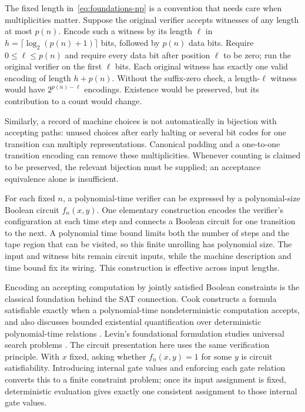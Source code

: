 The fixed length in~\eqref{eq:foundations-np} is a convention that needs
care when multiplicities matter. Suppose the original verifier accepts
witnesses of any length at most $p(n)$. Encode such a witness by its length
$\ell$ in $h=\lceil\log_2(p(n)+1)\rceil$ bits, followed by $p(n)$
data bits. Require $0\le\ell\le p(n)$ and require every data bit after
position $\ell$ to be zero; run the original verifier on the first $\ell$
bits. Each original witness has exactly one valid encoding of length
$h+p(n)$. Without the suffix-zero check, a length-$\ell$ witness would
have $2^{p(n)-\ell}$ encodings. Existence would be preserved, but its
contribution to a count would change.

Similarly, a record of machine choices is not automatically in bijection
with accepting paths: unused choices after early halting or several bit
codes for one transition can multiply representations. Canonical padding
and a one-to-one transition encoding can remove these multiplicities.
Whenever counting is claimed to be preserved, the relevant bijection must
be supplied; an acceptance equivalence alone is insufficient.

For each fixed $n$, a polynomial-time verifier can be expressed by a
polynomial-size Boolean circuit $f_n(x,y)$. One elementary construction
encodes the verifier's configuration at each time step and connects a
Boolean circuit for one transition to the next. A polynomial time bound
limits both the number of steps and the tape region that can be visited,
so this finite unrolling has polynomial size. The input and witness bits
remain circuit inputs, while the machine description and time bound fix
its wiring. This construction is effective across input lengths.

Encoding an accepting computation by jointly satisfied Boolean constraints
is the classical foundation behind the SAT connection. Cook constructs a
formula satisfiable exactly when a polynomial-time nondeterministic
computation accepts, and also discusses bounded existential quantification
over deterministic polynomial-time relations \citep{Cook1971}.
Levin's foundational formulation studies universal search problems
\citep{Levin1973}. The circuit presentation here uses the same
verification principle. With $x$ fixed, asking whether $f_n(x,y)=1$ for
some $y$ is circuit satisfiability. Introducing internal gate values and
enforcing each gate relation converts this to a finite constraint problem;
once its input assignment is fixed, deterministic evaluation gives exactly
one consistent assignment to those internal gate values.

